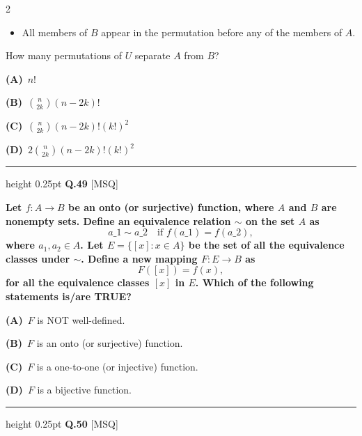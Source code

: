 \documentclass[a4paper,10pt,twoside]{article}
\begin{document}
\begin{multicols}{2}
{\begin{itemize}[itemsep=0pt,topsep=2pt]
\item All members of $B$ appear in the permutation before any of the members of $A$.
\end{itemize}
How many permutations of $U$ separate $A$ from $B$? \par}
\par\vspace{2pt}\noindent
\textbf{(A)}~$n!$\par\vspace{2pt}\noindent
\textbf{(B)}~$\binom{n}{2k} (n - 2k)!$\par\vspace{2pt}\noindent
\textbf{(C)}~$\binom{n}{2k} (n - 2k)! (k!)^2$\par\vspace{2pt}\noindent
\textbf{(D)}~$2 \binom{n}{2k} (n - 2k)! (k!)^2$
\par\vspace{6pt}\hrule height 0.25pt\vspace{6pt}
\noindent\textbf{Q.49} \hfill {\footnotesize\textsf{[MSQ]}}
\par\vspace{2pt}
{\bfseries Let $f : A \to B$ be an onto (or surjective) function, where $A$ and $B$ are nonempty sets. Define an equivalence relation $\sim$ on the set $A$ as
\[ a\_1 \sim a\_2 \quad \text{if } f(a\_1) = f(a\_2), \]
where $a_1, a_2 \in A$. Let $E = \{[x] : x \in A\}$ be the set of all the equivalence classes under $\sim$. Define a new mapping $F : E \to B$ as
\[ F([x]) = f(x), \]
for all the equivalence classes $[x]$ in $E$.
Which of the following statements is/are TRUE? \par}
\par\vspace{2pt}\noindent
\textbf{(A)}~$F$ is NOT well-defined.\par\vspace{2pt}\noindent
\textbf{(B)}~$F$ is an onto (or surjective) function.\par\vspace{2pt}\noindent
\textbf{(C)}~$F$ is a one-to-one (or injective) function.\par\vspace{2pt}\noindent
\textbf{(D)}~$F$ is a bijective function.
\par\vspace{6pt}\hrule height 0.25pt\vspace{6pt}
\noindent\textbf{Q.50} \hfill {\footnotesize\textsf{[MSQ]}}
\par\vspace{2pt}

\end{multicols}
\end{document}
